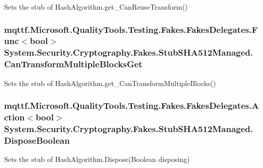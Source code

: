 Sets the stub of Hash\-Algorithm.\-get\-\_\-\-Can\-Reuse\-Transform()

\hypertarget{class_system_1_1_security_1_1_cryptography_1_1_fakes_1_1_stub_s_h_a512_managed_a6c24f2c171e7bc4a80861eda3da43e3a}{
\subsubsection[{Can\-Transform\-Multiple\-Blocks\-Get}]{\setlength{\rightskip}{0pt plus 5cm}mqttf.\-Microsoft.\-Quality\-Tools.\-Testing.\-Fakes.\-Fakes\-Delegates.\-Func$<$bool$>$ System.\-Security.\-Cryptography.\-Fakes.\-Stub\-S\-H\-A512\-Managed.\-Can\-Transform\-Multiple\-Blocks\-Get}}\label{class_system_1_1_security_1_1_cryptography_1_1_fakes_1_1_stub_s_h_a512_managed_a6c24f2c171e7bc4a80861eda3da43e3a}


Sets the stub of Hash\-Algorithm.\-get\-\_\-\-Can\-Transform\-Multiple\-Blocks()

\hypertarget{class_system_1_1_security_1_1_cryptography_1_1_fakes_1_1_stub_s_h_a512_managed_a002da9e2f8e221f2c1d86dd262ef8fe3}{
\subsubsection[{Dispose\-Boolean}]{\setlength{\rightskip}{0pt plus 5cm}mqttf.\-Microsoft.\-Quality\-Tools.\-Testing.\-Fakes.\-Fakes\-Delegates.\-Action$<$bool$>$ System.\-Security.\-Cryptography.\-Fakes.\-Stub\-S\-H\-A512\-Managed.\-Dispose\-Boolean}}\label{class_system_1_1_security_1_1_cryptography_1_1_fakes_1_1_stub_s_h_a512_managed_a002da9e2f8e221f2c1d86dd262ef8fe3}


Sets the stub of Hash\-Algorithm.\-Dispose(\-Boolean disposing)

